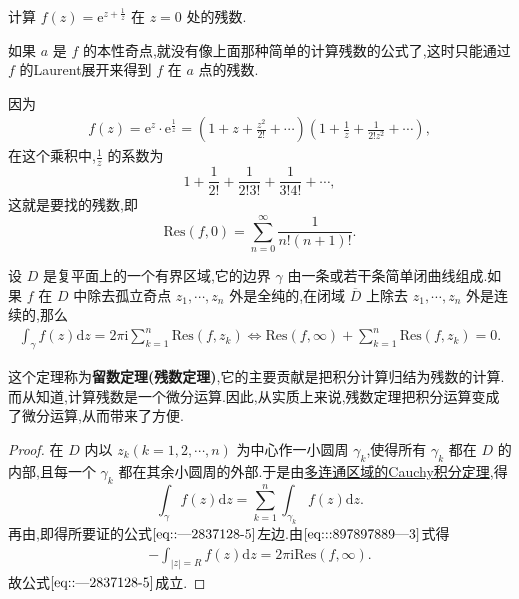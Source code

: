 \documentclass[../../main.tex]{subfiles}%
\begin{document}
\begin{example}
计算 \( f(z) = \mathrm{e}^{z + \frac{1}{z}} \) 在 \( z = 0 \) 处的残数.
\end{example}
\begin{remark}
如果 \( a \) 是 \( f \) 的本性奇点,就没有像上面那种简单的计算残数的公式了,这时只能通过 \( f \) 的Laurent展开来得到 \( f \) 在 \( a \) 点的残数.
\end{remark}
\begin{solution}

因为
\begin{align*}
f(z) = \mathrm{e}^z \cdot \mathrm{e}^{\frac{1}{z}} = \left( 1 + z + \frac{z^2}{2!} + \cdots \right) \left( 1 + \frac{1}{z} + \frac{1}{2! z^2} + \cdots \right),
\end{align*}
在这个乘积中,\( \frac{1}{z} \) 的系数为
\[
1 + \frac{1}{2!} + \frac{1}{2! 3!} + \frac{1}{3! 4!} + \cdots,
\]
这就是要找的残数,即
\[
\mathrm{Res}(f,0) = \sum_{n = 0}^{\infty} \frac{1}{n! (n + 1)!}.
\]

\end{solution}

\begin{theorem}\label{theorem:留数定理(残数定理)-定理5.4.9}
设 \( D \) 是复平面上的一个有界区域,它的边界 \( \gamma \) 由一条或若干条简单闭曲线组成.如果 \( f \) 在 \( D \) 中除去孤立奇点 \( z_1, \cdots, z_n \) 外是全纯的,在闭域 \( \overline{D} \) 上除去 \( z_1, \cdots, z_n \) 外是连续的,那么
\begin{align}
\int_{\gamma}{f\left( z \right) \mathrm{d}z}=2\pi \mathrm{i}\sum_{k=1}^n{\mathrm{Res}\left( f,z_k \right)}\Longleftrightarrow \mathrm{Res}\left( f,\infty \right) +\sum_{k=1}^n{\mathrm{Res}\left( f,z_k \right)}=0.\label{eq::---2837128-5}
\end{align}
\end{theorem}
\begin{remark}
这个定理称为\textbf{留数定理(残数定理)},它的主要贡献是把积分计算归结为残数的计算.而从知道,计算残数是一个微分运算.因此,从实质上来说,残数定理把积分运算变成了微分运算,从而带来了方便.
\end{remark}
\begin{proof}

在 \( D \) 内以 \( z_k (k = 1, 2, \cdots, n) \) 为中心作一小圆周 \( \gamma_k \),使得所有 \( \gamma_k \) 都在 \( D \) 的内部,且每一个 \( \gamma_k \) 都在其余小圆周的外部.于是由\hyperref[theorem:定理3.2.5]{多连通区域的Cauchy积分定理},得
\[
\int_{\gamma} f(z) \mathrm{d}z = \sum_{k = 1}^{n} \int_{\gamma_k} f(z) \mathrm{d}z.
\]
再由,即得所要证的公式\(\eqref{eq::---2837128-5}\)左边.由\(\eqref{eq:::897897889---3}\)式得
\begin{align*}
- \int_{|z| = R} f(z) \mathrm{d}z = 2\pi \mathrm{i} \mathrm{Res}(f, \infty).
\end{align*}
故公式\(\eqref{eq::---2837128-5}\)成立.

\end{proof}
\end{document}
